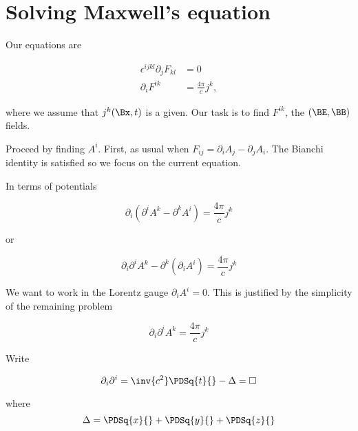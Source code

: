%
%
\section{Solving Maxwell's equation}

Our equations are

\begin{align}\label{eqn:relativisticElectrodynamicsL17:210}
\epsilon^{i j k l} \partial_j F_{k l} &= 0 \\
\partial_i F^{i k} &= \frac{4 \pi}{c} j^k,
\end{align}

where we assume that $j^k(\Bx, t)$ is a given.  Our task is to find $F^{i k}$, the $(\BE, \BB)$ fields.

Proceed by finding $A^i$.  First, as usual when $F_{i j} = \partial_i A_j - \partial_j A_i$.  The Bianchi identity is satisfied so we focus on the current equation.

In terms of potentials

\begin{equation}\label{eqn:relativisticElectrodynamicsL17:230}
\partial_i (\partial^i A^k - \partial^k A^i) = \frac{ 4 \pi}{c} j^k
\end{equation}

or

\begin{equation}\label{eqn:relativisticElectrodynamicsL17:250}
\partial_i \partial^i A^k - \partial^k (\partial_i A^i) = \frac{ 4 \pi}{c} j^k
\end{equation}

We want to work in the Lorentz gauge $\partial_i A^i = 0$.  This is justified by the simplicity of the remaining problem

\begin{equation}\label{eqn:relativisticElectrodynamicsL17:270}
\partial_i \partial^i A^k = \frac{4 \pi}{c} j^k
\end{equation}

Write

\begin{equation}\label{eqn:relativisticElectrodynamicsL17:290}
\partial_i \partial^i = \inv{c^2} \PDSq{t}{} - \Delta = \square
\end{equation}

where
\begin{equation}\label{eqn:relativisticElectrodynamicsL17:291}
\Delta = \PDSq{x}{} + \PDSq{y}{} + \PDSq{z}{}
\end{equation}

